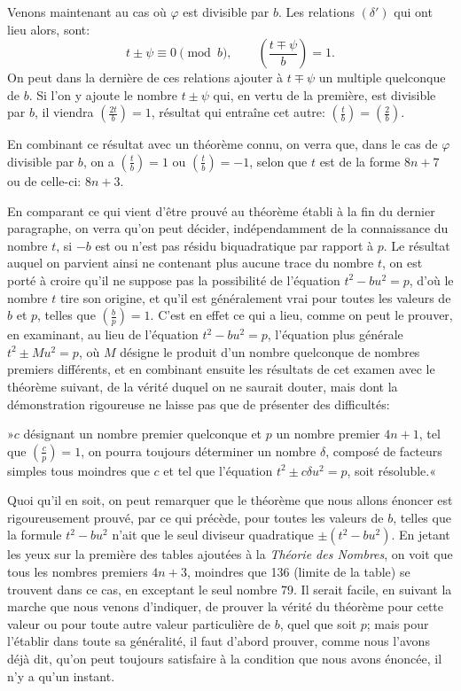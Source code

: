 \documentclass[11pt]{article}
\newcommand{\leg}[2]{\left(\frac{#1}{#2}\right)}
\newcommand{\unitid}[1]{\hypertarget{#1}{}}
\begin{document}
\unitid{dirichlet.v1.p04b.par.010}Venons maintenant au cas où $\varphi$ est divisible par $b$. Les relations $(\delta')$ qui ont lieu alors, sont:
\unitid{dirichlet.v1.p04b.eq.013}
\[
t\pm\psi\equiv0\pmod b,\qquad
\leg{t\mp\psi}{b}=1.
\]
On peut dans la dernière de ces relations ajouter à $t\mp\psi$ un multiple quelconque de $b$. Si l'on y ajoute le nombre $t\pm\psi$ qui, en vertu de la première, est divisible par $b$, il viendra $\leg{2t}{b}=1$, résultat qui entraîne cet autre: $\leg{t}{b}=\leg{2}{b}$.

\unitid{dirichlet.v1.p04b.par.011}En combinant ce résultat avec un théorème connu, on verra que, dans le cas de $\varphi$ divisible par $b$, on a $\leg{t}{b}=1$ ou $\leg{t}{b}=-1$, selon que $t$ est de la forme $8n+7$ ou de celle-ci: $8n+3$.

\unitid{dirichlet.v1.p04b.par.012}En comparant ce qui vient d'être prouvé au théorème établi à la fin du dernier paragraphe, on verra qu'on peut décider, indépendamment de la connaissance du nombre $t$, si $-b$ est ou n'est pas résidu biquadratique par rapport à $p$. Le résultat auquel on parvient ainsi ne contenant plus aucune trace du nombre $t$, on est porté à croire qu'il ne suppose pas la possibilité de l'équation $t^2-bu^2=p$, d'où le nombre $t$ tire son origine, et qu'il est généralement vrai pour toutes les valeurs de $b$ et $p$, telles que $\leg{b}{p}=1$. C'est en effet ce qui a lieu, comme on peut le prouver, en examinant, au lieu de l'équation $t^2-bu^2=p$, l'équation plus générale $t^2\pm Mu^2=p$, où $M$ désigne le produit d'un nombre quelconque de nombres premiers différents, et en combinant ensuite les résultats de cet examen avec le théorème suivant, de la vérité duquel on ne saurait douter, mais dont la démonstration rigoureuse ne laisse pas que de présenter des difficultés:

\unitid{dirichlet.v1.p04b.par.013}»$c$ désignant un nombre premier quelconque et $p$ un nombre premier $4n+1$, tel que $\leg{c}{p}=1$, on pourra toujours déterminer un nombre $\delta$, composé de facteurs simples tous moindres que $c$ et tel que l'équation $t^2\pm c\delta u^2=p$, soit résoluble.«

\unitid{dirichlet.v1.p04b.par.014}Quoi qu'il en soit, on peut remarquer que le théorème que nous allons énoncer est rigoureusement prouvé, par ce qui précède, pour toutes les valeurs de $b$, telles que la formule $t^2-bu^2$ n'ait que le seul diviseur quadratique $\pm(t^2-bu^2)$. En jetant les yeux sur la première des tables ajoutées à la \emph{Théorie des Nombres}, on voit que tous les nombres premiers $4n+3$, moindres que 136 (limite de la table) se trouvent dans ce cas, en exceptant le seul nombre 79. Il serait facile, en suivant la marche que nous venons d'indiquer, de prouver la vérité du théorème pour cette valeur ou pour toute autre valeur particulière de $b$, quel que soit $p$; mais pour l'établir dans toute sa généralité, il faut d'abord prouver, comme nous l'avons déjà dit, qu'on peut toujours satisfaire à la condition que nous avons énoncée, il n'y a qu'un instant.
\end{document}
